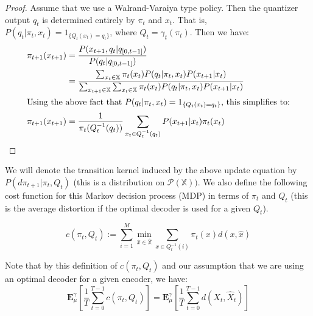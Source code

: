 \documentclass{article}
\begin{document}
\begin{proof}
    Assume that we use a Walrand-Varaiya type policy. Then the quantizer output \(q_t\) is determined entirely by \(\pi_t\) and \(x_t\). That is, \( P(q_t | \pi_t,x_t) = 1_{\{Q_t(x_t)=q_t\}} \), where \( Q_t = \gamma_t(\pi_t) \). Then we have:
    \begin{align*}
        \pi_{t+1}(x_{t+1}) & = \frac{P(x_{t+1},q_t | q_{[0,t-1]})}{P(q_t | q_{[0,t-1]})}                                                                                                                          \\
                           & = \frac{\sum_{x_t \in \mathbb{X}} \pi_t(x_t)P(q_t | \pi_t,x_t)P(x_{t+1} | x_t)}{\sum_{x_{t+1} \in \mathbb{X}}\sum_{x_t \in \mathbb{X}} \pi_t(x_t)P(q_t | \pi_t,x_t)P(x_{t+1} | x_t)} \\
        \intertext{Using the above fact that \( P(q_t | \pi_t,x_t) = 1_{\{Q_t(x_t)=q_t\}} \), this simplifies to:}
        \pi_{t+1}(x_{t+1}) & = \frac{1}{\pi_t(Q_t^{-1}(q_t))}\sum_{x_t \in Q_t^{-1}(q_t)}P(x_{t+1} | x_t)\pi_t(x_t)
    \end{align*}
\end{proof}

We will denote the transition kernel induced by the above update equation by \( P(d\pi_{t+1} | \pi_t, Q_t) \) (this is a distribution on \( \mathcal{P(\mathbb{X})}) \). We also define the following cost function for this Markov decision process (MDP) in terms of \( \pi_t \) and \( Q_t \) (this is the average distortion if the optimal decoder is used for a given \(Q_t\)).

\begin{equation}\label{eq:cost}
    c(\pi_t, Q_t) := \sum_{i=1}^M \min_{\hat{x} \in \hat{\mathbb{X}}} \sum_{x \in Q_t^{-1}(i)} \pi_t(x)d(x,\hat{x})
\end{equation}

Note that by this definition of \( c(\pi_t,Q_t) \) and our assumption that we are using an optimal decoder for a given encoder, we have:
\[\mathbf{E}_{\mu}^{\gamma}\left[\frac{1}{T}\sum_{t=0}^{T-1}c(\pi_t,Q_t)\right] = \mathbf{E}_{\mu}^{\gamma}\left[\frac{1}{T}\sum_{t=0}^{T-1}d(X_t,\hat{X}_t)\right]\]

\end{document}
